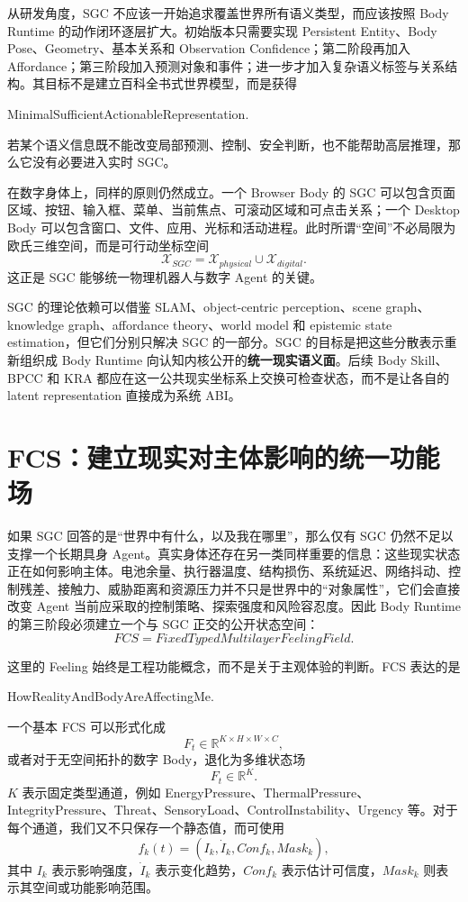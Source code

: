 从研发角度，SGC 不应该一开始追求覆盖世界所有语义类型，而应该按照 Body Runtime 的动作闭环逐层扩大。初始版本只需要实现 Persistent Entity、Body Pose、Geometry、基本关系和 Observation Confidence；第二阶段再加入 Affordance；第三阶段加入预测对象和事件；进一步才加入复杂语义标签与关系结构。其目标不是建立百科全书式世界模型，而是获得
\begin{statementbox}
MinimalSufficientActionableRepresentation.
\end{statementbox}
若某个语义信息既不能改变局部预测、控制、安全判断，也不能帮助高层推理，那么它没有必要进入实时 SGC。

在数字身体上，同样的原则仍然成立。一个 Browser Body 的 SGC 可以包含页面区域、按钮、输入框、菜单、当前焦点、可滚动区域和可点击关系；一个 Desktop Body 可以包含窗口、文件、应用、光标和活动进程。此时所谓“空间”不必局限为欧氏三维空间，而是可行动坐标空间
\[
\mathcal X_{SGC}
=
\mathcal X_{physical}
\cup
\mathcal X_{digital}.
\]
这正是 SGC 能够统一物理机器人与数字 Agent 的关键。

SGC 的理论依赖可以借鉴 SLAM、object-centric perception、scene graph、knowledge graph、affordance theory、world model 和 epistemic state estimation，但它们分别只解决 SGC 的一部分。SGC 的目标是把这些分散表示重新组织成 Body Runtime 向认知内核公开的\textbf{统一现实语义面}。后续 Body Skill、BPCC 和 KRA 都应在这一公共现实坐标系上交换可检查状态，而不是让各自的 latent representation 直接成为系统 ABI。

\section{FCS：建立现实对主体影响的统一功能场}

如果 SGC 回答的是“世界中有什么，以及我在哪里”，那么仅有 SGC 仍然不足以支撑一个长期具身 Agent。真实身体还存在另一类同样重要的信息：这些现实状态正在如何影响主体。电池余量、执行器温度、结构损伤、系统延迟、网络抖动、控制残差、接触力、威胁距离和资源压力并不只是世界中的“对象属性”，它们会直接改变 Agent 当前应采取的控制策略、探索强度和风险容忍度。因此 Body Runtime 的第三阶段必须建立一个与 SGC 正交的公开状态空间：
\[
\boxed{
FCS=FixedTypedMultilayerFeelingField.
}
\]

这里的 Feeling 始终是工程功能概念，而不是关于主观体验的判断。FCS 表达的是
\begin{statementbox}
HowRealityAndBodyAreAffectingMe.
\end{statementbox}
一个基本 FCS 可以形式化成
\[
F_t
\in
\mathbb R^{K\times H\times W\times C},
\]
或者对于无空间拓扑的数字 Body，退化为多维状态场
\[
F_t
\in
\mathbb R^K.
\]
$K$ 表示固定类型通道，例如 EnergyPressure、ThermalPressure、IntegrityPressure、Threat、SensoryLoad、ControlInstability、Urgency 等。对于每个通道，我们又不只保存一个静态值，而可使用
\[
f_k(t)
=
\left(
I_k,
\dot I_k,
Conf_k,
Mask_k
\right),
\]
其中 $I_k$ 表示影响强度，$\dot I_k$ 表示变化趋势，$Conf_k$ 表示估计可信度，$Mask_k$ 则表示其空间或功能影响范围。

